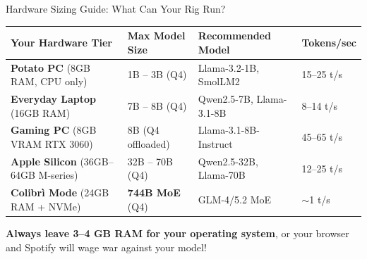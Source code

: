 \documentclass[10pt,aspectratio=169]{beamer}
\begin{document}
\begin{frame}{Hardware Sizing Guide: What Can Your Rig Run?}
    \begin{table}
        \small
        \begin{tabular}{llll}
            \toprule
            \textbf{Your Hardware Tier} & \textbf{Max Model Size} & \textbf{Recommended Model} & \textbf{Tokens/sec} \\
            \midrule
            \textbf{Potato PC} (8GB RAM, CPU only) & 1B -- 3B (Q4) & Llama-3.2-1B, SmolLM2 & 15--25 t/s \\
            \textbf{Everyday Laptop} (16GB RAM) & 7B -- 8B (Q4) & Qwen2.5-7B, Llama-3.1-8B & 8--14 t/s \\
            \textbf{Gaming PC} (8GB VRAM RTX 3060) & 8B (Q4 offloaded) & Llama-3.1-8B-Instruct & 45--65 t/s \\
            \textbf{Apple Silicon} (36GB--64GB M-series) & 32B -- 70B (Q4) & Qwen2.5-32B, Llama-70B & 12--25 t/s \\
            \textbf{Colibr\`i Mode} (24GB RAM + NVMe) & \textbf{744B MoE} (Q4) & GLM-4/5.2 MoE & $\sim$1 t/s \\
            \bottomrule
        \end{tabular}
    \end{table}
    \vspace{0.3cm}
    \begin{tcolorbox}[colback=ShoeAccent!10, colframe=ShoeAccent, title=\textbf{The Golden Memory Rule}]
        \small
        \textbf{Always leave 3--4 GB RAM for your operating system}, or your browser and Spotify will wage war against your model!
    \end{tcolorbox}
\end{frame}
\end{document}
